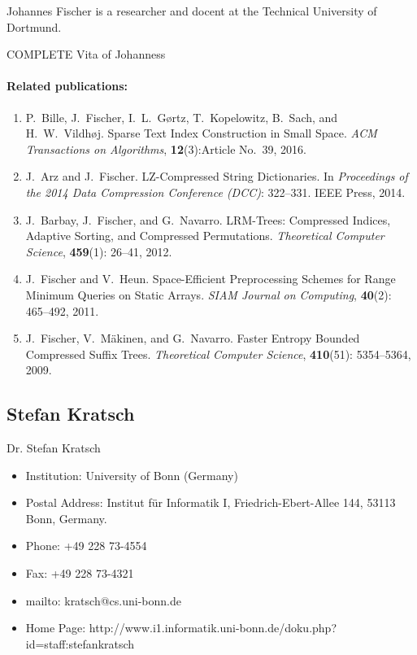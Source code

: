 \documentclass[a4paper,10pt]{article}
\begin{document}
Johannes Fischer  is a researcher and docent at the Technical University of Dortmund.
\begin{TODO}
COMPLETE Vita of Johanness
\end{TODO}

\paragraph{Related publications:}
\begin{enumerate}
\item P.\ Bille, J.\ Fischer, I.\ L.\ G\o{}rtz, T.\ Kopelowitz, B.\ Sach, and H.\ W.\ Vildh\o{}j.
	\newblock Sparse Text Index Construction in Small Space.
	\newblock \emph{ACM Transactions on Algorithms}, \textbf{12}(3):Article No.\ 39, 2016.
\item J.\ Arz and J.\ Fischer.
	\newblock LZ-Compressed String Dictionaries.
	\newblock In \textit{Proceedings of the 2014 Data Compression Conference (DCC)}: 322--331. IEEE Press, 2014.
\item J.\ Barbay, J.\ Fischer, and G.\ Navarro.
	\newblock LRM-Trees: Compressed Indices, Adaptive Sorting, and Compressed Permutations.
	\newblock \textit{Theoretical Computer Science}, \textbf{459}(1): 26--41, 2012.
\item J.\ Fischer and V.\ Heun.
	\newblock Space-Efficient Preprocessing Schemes for Range Minimum Queries on Static Arrays.
	\newblock \textit{SIAM Journal on Computing}, \textbf{40}(2): 465--492, 2011.
\item J.\ Fischer, V.\ M\"akinen, and G.\ Navarro.
	\newblock Faster Entropy Bounded Compressed Suffix Trees.
	\newblock \textit{Theoretical Computer Science}, \textbf{410}(51): 5354--5364, 2009.
\end{enumerate}

\subsection*{Stefan Kratsch}

Dr. Stefan Kratsch
  \begin{itemize}
\item Institution: University of Bonn (Germany)
\item Postal Address: Institut f\"ur Informatik I, Friedrich-Ebert-Allee 144, 53113 Bonn, Germany.
\item Phone: +49 228 73-4554
\item Fax: +49 228 73-4321 
\item mailto: kratsch@cs.uni-bonn.de
\item Home Page: http://www.i1.informatik.uni-bonn.de/doku.php?id=staff:stefankratsch
  \end{itemize}
\end{document}
